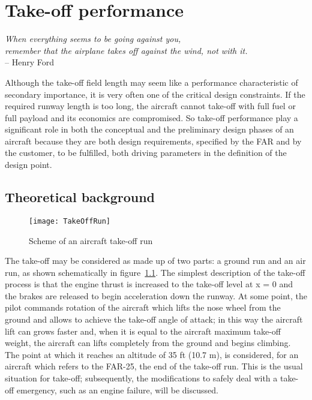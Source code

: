 \chapter{Take-off performance}
\label{chap:TakeOff}

\begin{flushright}
	{\smaller
		\textit{When everything seems to be going against you, \\ remember that the airplane takes off against the wind, not with it.}\\
		-- Henry Ford}
\end{flushright}

\noindent
Although the take-off field length may seem like a performance characteristic of secondary importance, it is very often one of the critical design constraints. If the required runway length is too long, the aircraft cannot take-off with full fuel or full payload and its economics are compromised.
%
So take-off performance play a significant role in both the conceptual and the preliminary design phases of an aircraft because they are both design requirements, specified by the \gls{FAR} and by the customer, to be fulfilled, both driving parameters in the definition of the design point. 
%
\section{Theoretical background}
%
\begin{figure}[!b]
\centering
\texttt{[image: TakeOffRun]}
\caption{Scheme of an aircraft take-off run}
\label{fig:TOrun}
\end{figure}
%
The take-off may be considered as made up of two parts: a ground run and an air run, as shown schematically in figure~\ref{fig:TOrun}. The simplest description of the take-off process is that the engine thrust is increased to the take-off level at x = 0 and the brakes are released to begin acceleration down the runway. At some point, the pilot commands rotation of the aircraft which lifts the nose wheel from the ground and allows to achieve the take-off angle of attack; in this way the aircraft lift can grows faster and, when it is equal to the aircraft maximum take-off weight, the aircraft can lifts completely from the ground and begins climbing. The point at which it reaches an altitude of 35 \si{ft} (10.7 \si{\meter}), is considered, for an aircraft which refers to the \gls{FAR}-25, the end of the take-off run. 
%
This is the usual situation for take-off; subsequently, the modifications to safely deal with a take-off emergency, such as an engine failure, will be discussed.
%
